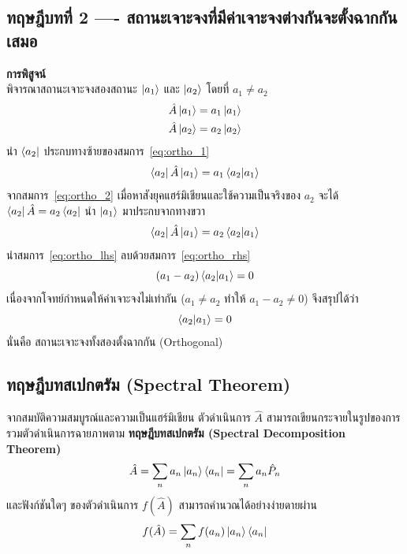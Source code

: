 \subsection{ทฤษฎีบทที่ 2 ---- สถานะเจาะจงที่มีค่าเจาะจงต่างกันจะตั้งฉากกันเสมอ}
\textbf{การพิสูจน์} \\
พิจารณาสถานะเจาะจงสองสถานะ $\ket{a_1}$ และ $\ket{a_2}$ โดยที่ $a_1 \ne a_2$
\begin{align}
\hat{A}\ket{a_1} &= a_1\ket{a_1} \label{eq:ortho_1} \\
\hat{A}\ket{a_2} &= a_2\ket{a_2} \label{eq:ortho_2}
\end{align}
นำ $\bra{a_2}$ ประกบทางซ้ายของสมการ~\eqref{eq:ortho_1}
\begin{equation}
\bra{a_2}\hat{A}\ket{a_1} = a_1\braket{a_2}{a_1}
\label{eq:ortho_lhs}
\end{equation}
จากสมการ~\eqref{eq:ortho_2} เมื่อหาสังยุคแฮร์มิเชียนและใช้ความเป็นจริงของ $a_2$ จะได้ $\bra{a_2}\hat{A} = a_2\bra{a_2}$ นำ $\ket{a_1}$ มาประกบจากทางขวา
\begin{equation}
\bra{a_2}\hat{A}\ket{a_1} = a_2\braket{a_2}{a_1}
\label{eq:ortho_rhs}
\end{equation}
นำสมการ~\eqref{eq:ortho_lhs} ลบด้วยสมการ~\eqref{eq:ortho_rhs}
\begin{equation}
(a_1 - a_2)\braket{a_2}{a_1} = 0
\end{equation}
เนื่องจากโจทย์กำหนดให้ค่าเจาะจงไม่เท่ากัน ($a_1 \ne a_2$ ทำให้ $a_1 - a_2 \ne 0$) จึงสรุปได้ว่า
\begin{equation}
\braket{a_2}{a_1} = 0
\end{equation}
นั่นคือ สถานะเจาะจงทั้งสองตั้งฉากกัน (Orthogonal)

\subsection{ทฤษฎีบทสเปกตรัม (Spectral Theorem)}
จากสมบัติความสมบูรณ์และความเป็นแฮร์มิเชียน ตัวดำเนินการ $\hat{A}$ สามารถเขียนกระจายในรูปของการรวมตัวดำเนินการฉายภาพตาม \textbf{ทฤษฎีบทสเปกตรัม (Spectral Decomposition Theorem)}
\begin{equation}
\hat{A} = \sum_n a_n \ket{a_n}\bra{a_n} = \sum_n a_n \hat{P}_n
\label{eq:spectral_decomposition}
\end{equation}
และฟังก์ชันใดๆ ของตัวดำเนินการ $f(\hat{A})$ สามารถคำนวณได้อย่างง่ายดายผ่าน
\begin{equation}
f(\hat{A}) = \sum_n f(a_n) \ket{a_n}\bra{a_n}
\label{eq:operator_function}
\end{equation}

